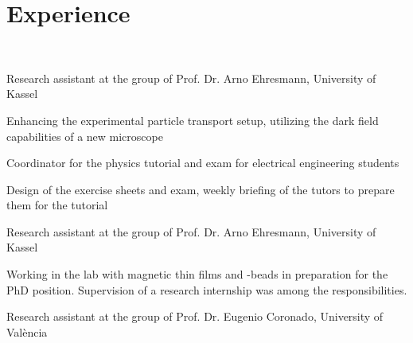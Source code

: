 \begin{minipage}[t]{0.70\textwidth} 





\section{Experience}
 \\
\vspace{\topsep}
\begin{tightemize}
\item Research assistant at the group of Prof. Dr. Arno Ehresmann, University of Kassel 

Enhancing the experimental particle transport setup, utilizing the dark field capabilities of a new microscope
\end{tightemize}
\begin{tightemize}
\item Coordinator for the physics tutorial and exam for electrical engineering students

Design of the exercise sheets and exam, weekly briefing of the tutors to prepare them for the tutorial 
\end{tightemize}
\begin{tightemize}
\item Research assistant at the group of Prof. Dr. Arno Ehresmann, University of Kassel

Working in the lab with magnetic thin films and -beads in preparation for the PhD position. Supervision of a research internship was among the responsibilities.
\end{tightemize}
\begin{tightemize}
\item Research assistant at the group of Prof. Dr. Eugenio Coronado, University of València 


\end{tightemize}
\end{minipage}
